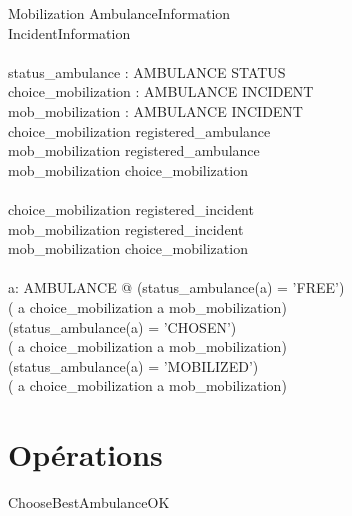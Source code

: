 \documentclass[12pt]{article}
\begin{document}
\begin{schema}{Mobilization}
	AmbulanceInformation \\
	IncidentInformation \\
	\newline \\
	status\_ambulance : AMBULANCE \pfun STATUS \\
	choice\_mobilization : AMBULANCE \pinj INCIDENT \\
	mob\_mobilization : AMBULANCE \pinj INCIDENT \\
  \where
  	\dom choice\_mobilization \subseteq registered\_ambulance \\
	\dom mob\_mobilization \subseteq registered\_ambulance \\
	\dom mob\_mobilization  \subseteq \dom choice\_mobilization \\
	\newline \\
	\ran choice\_mobilization \subseteq registered\_incident \\
	\ran mob\_mobilization \subseteq registered\_incident \\
	\ran mob\_mobilization  \subseteq \ran choice\_mobilization \\
	\newline \\
	\forall a: AMBULANCE @ 
			(status\_ambulance(a) = 'FREE') \equiv \\
	                        ( a \notin \dom choice\_mobilization \land a \notin \dom mob\_mobilization) \\
	                   \land
	                   (status\_ambulance(a) = 'CHOSEN') \equiv \\
	                        ( a \in \dom choice\_mobilization \land a \notin \dom mob\_mobilization) \\
	                     \land
	                   (status\_ambulance(a) = 'MOBILIZED') \equiv \\
	                        ( a \in \dom choice\_mobilization \land a \in \dom mob\_mobilization) \\
  	
\end{schema}

\section{Opérations}

\begin{schema}{ChooseBestAmbulanceOK}
  \where
\end{schema}
\end{document}

